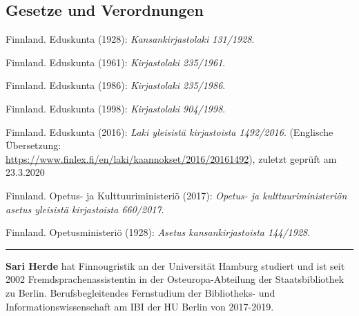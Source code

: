 \documentclass[a4paper,
fontsize=11pt,
oneside,
numbers=noperiodatend,
parskip=half-,
bibliography=totoc,
final
]{scrartcl}
\begin{document}
\hypertarget{gesetze-und-verordnungen}{%
\subsection{Gesetze und Verordnungen}\label{gesetze-und-verordnungen}}

Finnland. Eduskunta (1928): \emph{Kansankirjastolaki 131/1928}.

Finnland. Eduskunta (1961): \emph{Kirjastolaki 235/1961}.

Finnland. Eduskunta (1986): \emph{Kirjastolaki 235/1986}.

Finnland. Eduskunta (1998): \emph{Kirjastolaki 904/1998}.

Finnland. Eduskunta (2016): \emph{Laki yleisistä kirjastoista
1492/2016}. (Englische Übersetzung: \\
\url{https://www.finlex.fi/en/laki/kaannokset/2016/20161492}), zuletzt
geprüft am 23.3.2020

Finnland. Opetus- ja Kulttuuriministeriö (2017): \emph{Opetus- ja
kulttuuriministeriön asetus yleisistä kirjastoista 660/2017}.

Finnland. Opetusministeriö (1928): \emph{Asetus kansankirjastoista
144/1928}.

\begin{center}\rule{0.5\linewidth}{0.5pt}\end{center}

\textbf{Sari Herde} hat Finnougristik an der Universität Hamburg
studiert und ist seit 2002 Fremdsprachenassistentin in der
Osteuropa-Abteilung der Staatsbibliothek zu Berlin. Berufsbegleitendes
Fernstudium der Bibliotheks- und Informationswissenschaft am IBI der HU
Berlin von 2017-2019.
\end{document}
